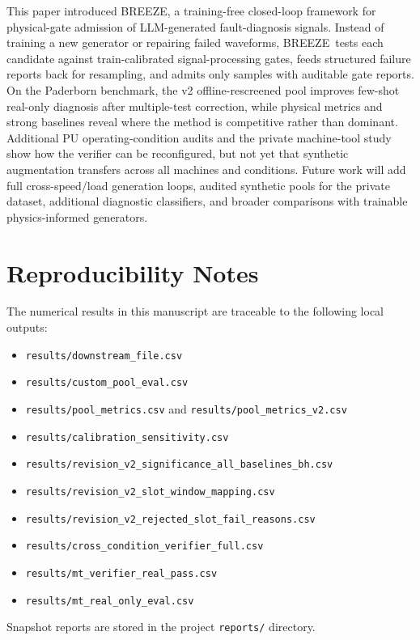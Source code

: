 \documentclass[review,3p,times]{elsarticle}
\newcommand{\breeze}{BREEZE}
\begin{document}
This paper introduced \breeze, a training-free closed-loop framework for
physical-gate admission of LLM-generated fault-diagnosis signals. Instead of
training a new generator or repairing failed waveforms, \breeze\ tests each
candidate against train-calibrated signal-processing gates, feeds structured
failure reports back for resampling, and admits only samples with auditable
gate reports. On the Paderborn benchmark, the v2 offline-rescreened pool
improves few-shot real-only diagnosis after multiple-test correction, while
physical metrics and strong baselines reveal where the method is competitive
rather than dominant. Additional PU operating-condition audits and the private
machine-tool study show how the verifier can be reconfigured, but not yet that
synthetic augmentation transfers across all machines and conditions. Future
work will add full cross-speed/load generation loops, audited synthetic pools
for the private dataset, additional diagnostic classifiers, and broader
comparisons with trainable physics-informed generators.

\section*{Reproducibility Notes}

The numerical results in this manuscript are traceable to the following local
outputs:
\begin{itemize}
  \item \texttt{results/downstream\_file.csv}
  \item \texttt{results/custom\_pool\_eval.csv}
  \item \texttt{results/pool\_metrics.csv} and
  \texttt{results/pool\_metrics\_v2.csv}
  \item \texttt{results/calibration\_sensitivity.csv}
  \item \texttt{results/revision\_v2\_significance\_all\_baselines\_bh.csv}
  \item \texttt{results/revision\_v2\_slot\_window\_mapping.csv}
  \item \texttt{results/revision\_v2\_rejected\_slot\_fail\_reasons.csv}
  \item \texttt{results/cross\_condition\_verifier\_full.csv}
  \item \texttt{results/mt\_verifier\_real\_pass.csv}
  \item \texttt{results/mt\_real\_only\_eval.csv}
\end{itemize}
Snapshot reports are stored in the project \texttt{reports/} directory.
\end{document}

